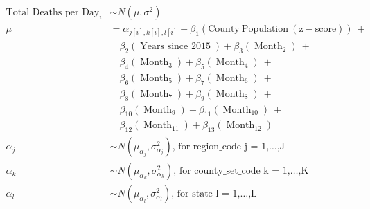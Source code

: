 $$
\begin{aligned}
  \operatorname{Total\ Deaths\ per\ Day}_{i}  &\sim N \left(\mu, \sigma^2 \right) \\
    \mu &=\alpha_{j[i],k[i],l[i]} + \beta_{1}(\operatorname{County\ Population\ (z-score)})\ + \\
&\quad \beta_{2}(\operatorname{Years\ since\ 2015}) + \beta_{3}(\operatorname{Month}_{\operatorname{2}})\ + \\
&\quad \beta_{4}(\operatorname{Month}_{\operatorname{3}}) + \beta_{5}(\operatorname{Month}_{\operatorname{4}})\ + \\
&\quad \beta_{6}(\operatorname{Month}_{\operatorname{5}}) + \beta_{7}(\operatorname{Month}_{\operatorname{6}})\ + \\
&\quad \beta_{8}(\operatorname{Month}_{\operatorname{7}}) + \beta_{9}(\operatorname{Month}_{\operatorname{8}})\ + \\
&\quad \beta_{10}(\operatorname{Month}_{\operatorname{9}}) + \beta_{11}(\operatorname{Month}_{\operatorname{10}})\ + \\
&\quad \beta_{12}(\operatorname{Month}_{\operatorname{11}}) + \beta_{13}(\operatorname{Month}_{\operatorname{12}}) \\
    \alpha_{j}  &\sim N \left(\mu_{\alpha_{j}}, \sigma^2_{\alpha_{j}} \right)
    \text{, for region\_code j = 1,} \dots \text{,J} \\
    \alpha_{k}  &\sim N \left(\mu_{\alpha_{k}}, \sigma^2_{\alpha_{k}} \right)
    \text{, for county\_set\_code k = 1,} \dots \text{,K} \\
    \alpha_{l}  &\sim N \left(\mu_{\alpha_{l}}, \sigma^2_{\alpha_{l}} \right)
    \text{, for state l = 1,} \dots \text{,L}
\end{aligned}
$$
